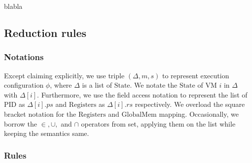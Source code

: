 \documentclass[a4paper]{article}
\newcommand*{\STATE}{\text{State}}
\newcommand*{\MEM}{\text{GlobalMem}}
\newcommand*{\PID}{\text{PID}}
\newcommand*{\REGS}{\text{Registers}}
\begin{document}
 blabla



\subsection{Reduction rules}
\subsubsection{Notations}
Except claiming explicitly, we use triple $(\Delta, m, s)$ to represent
execution configuration $\phi$, where $\Delta$ is a list of $\STATE$. We notate
the $\STATE$ of VM $i$ in $\Delta$ with $\Delta[i]$. Furthermore, we use the
field access notation to represent the list of $\PID$ as $\Delta[i].ps$ and
$\REGS$ as $\Delta[i].rs$ respectively. We overload the square bracket notation
for the $\REGS$ and $\MEM$ mapping. Occasionally, we borrow the $\in, \cup,$ and
$\cap$ operators from set, applying them on the list while keeping the semantics
same.


\subsubsection{Rules}
\end{document}
